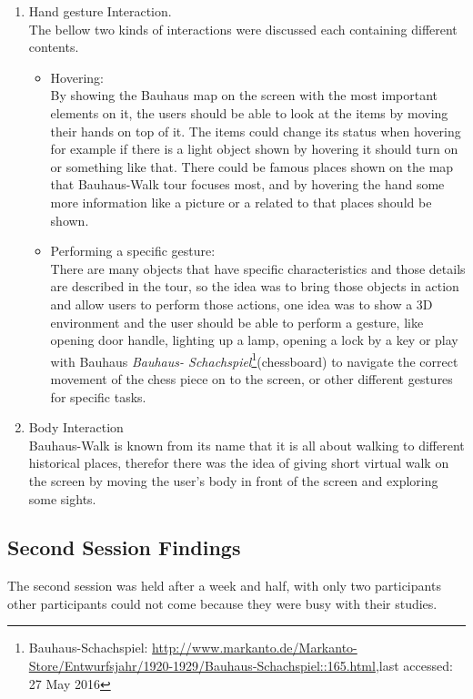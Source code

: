 \begin {enumerate}
\item	Hand gesture Interaction. \\
The bellow two kinds of interactions were discussed each containing different contents. 

\begin {itemize}
\item	Hovering: \\
By showing the Bauhaus map on the screen with the most important elements on it, the users should be able to look at the items by moving their hands on top of it. The items could change its status when hovering for example if there is a light object shown by hovering it should turn on or something like that.
There could be famous places shown on the map that Bauhaus-Walk tour focuses most, and by hovering the hand some more information like a picture or a related to that places should be shown.

\item	Performing a specific gesture:\\
There are many objects that have specific characteristics and those details are described in the tour, so the idea was to bring those objects in action and allow users to perform those actions, one idea was to show a 3D environment and the user should be able to perform a gesture, like opening door handle, lighting up a lamp, opening a lock by a key or play with Bauhaus \emph{Bauhaus- Schachspiel}\footnote{Bauhaus-Schachspiel: \url{http://www.markanto.de/Markanto-Store/Entwurfsjahr/1920-1929/Bauhaus-Schachspiel::165.html},last accessed: 27 May 2016 }(chessboard) to navigate the correct movement of the chess piece on to the screen, or other different gestures for specific tasks.
\end{itemize}

\item	Body Interaction  \\
Bauhaus-Walk is known from its name that it is all about walking to different historical places, therefor there was the idea of giving short virtual walk on the screen by moving the user's body in front of the screen and exploring some sights.

\end{enumerate}


\subsection{Second Session Findings}
The second session was held after a week and half, with only two participants other participants could not come because they were busy with their studies. 

